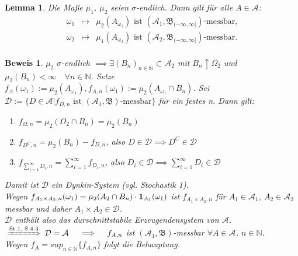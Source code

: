\documentclass[a4paper,11pt]{book}
\newcommand{\N}{{\mathbb N}}
\newcommand{\ind}{\text{\bf{1}}}
\def\AA{ \mathcal{A} }
\def\BB{ \mathfrak{B} }
\def\folgt{\ensuremath{\implies}}
\newcommand{\folgtnach}[1]{\ensuremath{\DOTSB\;\xRightarrow{\text{#1}}\;}}
\newtheorem{Lem}{Lemma}[chapter]
\theoremstyle{nonumberplain}
\newtheorem{Bew}{Beweis}
\begin{document}
\begin{Lem} \label{Lem3.2}Die Maße $\mu_1$, $\mu_2$ seien $\sigma$-endlich. Dann gilt für alle $A\in\AA$: \\
\begin{eqnarray*}
\omega_1 & \mapsto & \mu_2(A_{\omega_1}) \text{ ist } (\AA_1,\BB_{(-\infty,\infty]})\text{-messbar,} \\
\omega_2 & \mapsto & \mu_1(A_{\omega_2}) \text{ ist } (\AA_2,\BB_{(-\infty,\infty]})\text{-messbar.} \\
\end{eqnarray*}
\end{Lem}
\begin{Bew} $\mu_2$ $\sigma$-endlich $\folgt \exists (B_n)_{n\in\N}\subset\AA_2$ mit $B_n\uparrow\Omega_2$ und $\mu_2(B_n)<\infty\quad\forall n\in\N$. Setze $f_A(\omega_1):=\mu_2(A_{\omega_1}), f_{A,n}(\omega_1):=\mu_2(A_{\omega_1}\cap B_n)$. Sei $\mathcal{D}:=\{D\in\AA|f_{D,n}\text{ ist }(\AA_1,\BB)\text{-messbar}\}$ für ein festes n. Dann gilt: \\
\begin{enumerate}
\item[(i)] $f_{\Omega,n}=\mu_2(\Omega_2\cap B_n)=\mu_2(B_n)$
\item[(ii)] $f_{D^C,n}=\mu_2(B_n) - f_{D,n}$, also $D\in\mathcal{D}\folgt D^C\in\mathcal{D}$
\item[(iii)] $f_{\sum_{i=1}^{\infty}D_i,n} = \sum_{i=1}^{\infty}f_{D_i,n}$, also $D_i\in\mathcal{D}\folgt\sum_{i=1}^{\infty}D_i\in\mathcal{D}$
\end{enumerate}
Damit ist $\mathcal{D}$ ein Dynkin-System (vgl. Stochastik 1). \\
Wegen $f_{A_1\times A_2,n}(\omega_1) = \mu_2(A_2\cap B_n)\cdot \ind_{A_1}(\omega_1)$ ist $f_{A_1\times A_2,n}$ für $A_1\in\AA_1$, $A_2\in\AA_2$ messbar und daher $A_1\times A_2\in\mathcal{D}$. \\
$\mathcal{D}$ enthält also das durschnittstabile Erzeugendensystem von $\AA$. \\
$\folgtnach{St.1, S.4.3}\mathcal{D}=\AA \quad\folgt\quad f_{A,n}$ ist $(\AA_1,\BB)$-messbar $\forall A\in\AA$, $n\in\N$. \\
Wegen $f_A=sup_{n\in\N}\{f_{A,n}\}$ folgt die Behauptung.
\end{Bew}
\end{document}
